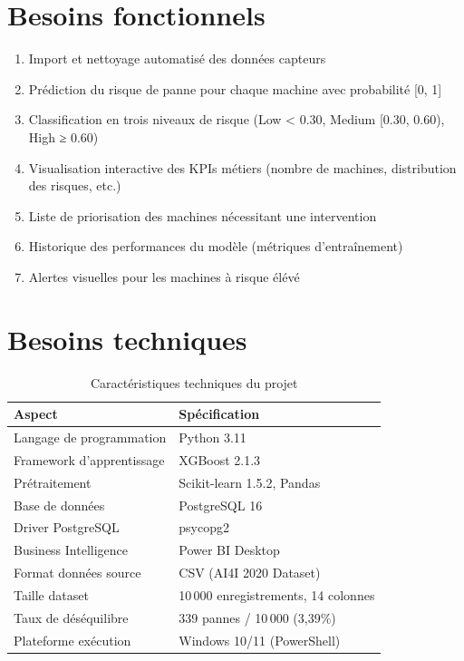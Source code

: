 \documentclass[a4paper,12pt,twoside]{report}
\begin{document}
\section{Besoins fonctionnels}

\begin{enumerate}
    \item Import et nettoyage automatisé des données capteurs
    \item Prédiction du risque de panne pour chaque machine avec probabilité [0, 1]
    \item Classification en trois niveaux de risque (Low < 0.30, Medium [0.30, 0.60), High ≥ 0.60)
    \item Visualisation interactive des KPIs métiers (nombre de machines, distribution des risques, etc.)
    \item Liste de priorisation des machines nécessitant une intervention
    \item Historique des performances du modèle (métriques d'entraînement)
    \item Alertes visuelles pour les machines à risque élévé
\end{enumerate}

\section{Besoins techniques}

\begin{table}[H]
\centering
\small
\caption{Caractéristiques techniques du projet}
\begin{tabular}{|l|l|}
\hline
\textbf{Aspect} & \textbf{Spécification} \\
\hline\hline
Langage de programmation & Python 3.11 \\
\hline
Framework d'apprentissage & XGBoost 2.1.3 \\
\hline
Prétraitement & Scikit-learn 1.5.2, Pandas \\
\hline
Base de données & PostgreSQL 16 \\
\hline
Driver PostgreSQL & psycopg2 \\
\hline
Business Intelligence & Power BI Desktop \\
\hline
Format données source & CSV (AI4I 2020 Dataset) \\
\hline
Taille dataset & 10\,000 enregistrements, 14 colonnes \\
\hline
Taux de déséquilibre & 339 pannes / 10\,000 (3,39\%) \\
\hline
Plateforme exécution & Windows 10/11 (PowerShell) \\
\hline
\end{tabular}
\end{table}
\end{document}
